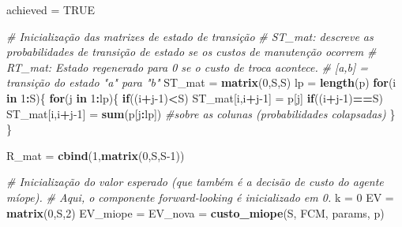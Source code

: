 \documentclass[12pt,a4paper]{article}
\newenvironment{Shaded}{\begin{snugshade}}{\end{snugshade}}
\newcommand{\CommentTok}[1]{\textcolor[rgb]{0.56,0.35,0.01}{\textit{#1}}}
\newcommand{\ControlFlowTok}[1]{\textcolor[rgb]{0.13,0.29,0.53}{\textbf{#1}}}
\newcommand{\DecValTok}[1]{\textcolor[rgb]{0.00,0.00,0.81}{#1}}
\newcommand{\KeywordTok}[1]{\textcolor[rgb]{0.13,0.29,0.53}{\textbf{#1}}}
\newcommand{\NormalTok}[1]{#1}
\newcommand{\OperatorTok}[1]{\textcolor[rgb]{0.81,0.36,0.00}{\textbf{#1}}}
\newcommand{\OtherTok}[1]{\textcolor[rgb]{0.56,0.35,0.01}{#1}}
\newcommand{\StringTok}[1]{\textcolor[rgb]{0.31,0.60,0.02}{#1}}
\begin{document}
\begin{Shaded}
\begin{Highlighting}[]
\NormalTok{  achieved =}\StringTok{ }\OtherTok{TRUE}
  
  \CommentTok{# Inicialização das matrizes de estado de transição}
  \CommentTok{# ST_mat: descreve as probabilidades de transição de estado se os custos de manutenção ocorrem}
  \CommentTok{# RT_mat: Estado regenerado para 0 se o custo de troca acontece.}
  \CommentTok{# [a,b] = transição do estado "a" para "b"}
\NormalTok{  ST_mat =}\StringTok{ }\KeywordTok{matrix}\NormalTok{(}\DecValTok{0}\NormalTok{,S,S)}
\NormalTok{  lp =}\StringTok{ }\KeywordTok{length}\NormalTok{(p)}
  \ControlFlowTok{for}\NormalTok{(i }\ControlFlowTok{in} \DecValTok{1}\OperatorTok{:}\NormalTok{S)\{}
    \ControlFlowTok{for}\NormalTok{(j }\ControlFlowTok{in} \DecValTok{1}\OperatorTok{:}\NormalTok{lp)\{}
      \ControlFlowTok{if}\NormalTok{((i}\OperatorTok{+}\NormalTok{j}\DecValTok{-1}\NormalTok{)}\OperatorTok{<}\NormalTok{S)  ST_mat[i,i}\OperatorTok{+}\NormalTok{j}\DecValTok{-1}\NormalTok{] =}\StringTok{ }\NormalTok{p[j]}
      \ControlFlowTok{if}\NormalTok{((i}\OperatorTok{+}\NormalTok{j}\DecValTok{-1}\NormalTok{)}\OperatorTok{==}\NormalTok{S) ST_mat[i,i}\OperatorTok{+}\NormalTok{j}\DecValTok{-1}\NormalTok{] =}\StringTok{ }\KeywordTok{sum}\NormalTok{(p[j}\OperatorTok{:}\NormalTok{lp]) }\CommentTok{#sobre as colunas (probabilidades colapsadas)}
\NormalTok{    \}}
\NormalTok{  \}}
  
\NormalTok{  R_mat =}\StringTok{ }\KeywordTok{cbind}\NormalTok{(}\DecValTok{1}\NormalTok{,}\KeywordTok{matrix}\NormalTok{(}\DecValTok{0}\NormalTok{,S,S}\DecValTok{-1}\NormalTok{))}
  
  \CommentTok{# Inicialização do valor esperado (que também é a decisão de custo do agente míope).}
  \CommentTok{# Aqui, o componente forward-looking é inicializado em 0.}
\NormalTok{  k =}\StringTok{ }\DecValTok{0}
\NormalTok{  EV =}\StringTok{ }\KeywordTok{matrix}\NormalTok{(}\DecValTok{0}\NormalTok{,S,}\DecValTok{2}\NormalTok{)}
\NormalTok{  EV_miope =}\StringTok{ }\NormalTok{EV_nova =}\StringTok{ }\KeywordTok{custo_miope}\NormalTok{(S, FCM, params, p)}
  

\end{Highlighting}
\end{Shaded}
\end{document}
